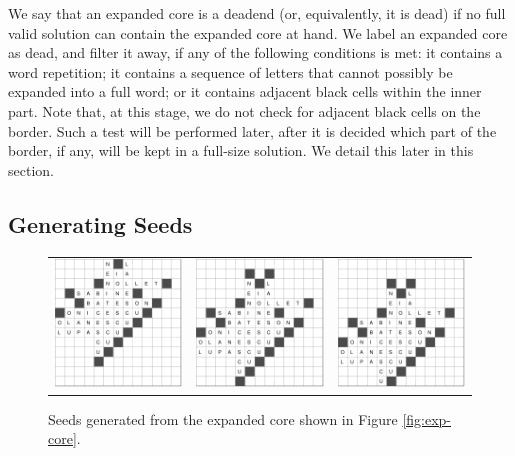We say that an expanded core is a deadend (or, equivalently, it is dead) if no full valid solution can contain the expanded core at hand. We label an expanded core as dead, and filter it away, if any of the
following conditions is met:
it contains a word repetition; it contains a sequence of letters that cannot
possibly be expanded into a full word; or it contains adjacent black cells within the inner part.
Note that, at this stage, we do not check for adjacent black cells on the border.
Such a test will be performed later, after it is decided which part of the
border, if any, will be kept in a full-size solution. We detail this later in this section.


\subsection{Generating Seeds}

\begin{figure}
\centering
\begin{tabular}{ccc}
\includegraphics[width=.32\textwidth]{_plots/alive-0-puzzle-72-2975-1488--1--1.pdf} &
\includegraphics[width=.32\textwidth]{_plots/alive-0-puzzle-72-2975-1488--1-1.pdf} & 
\includegraphics[width=.32\textwidth]{_plots/alive-0-puzzle-72-2975-1488--1-2.pdf}
\end{tabular}
\caption{Seeds generated from the expanded core shown in Figure \ref{fig:exp-core}.}
\label{fig:seeds}
\end{figure}


